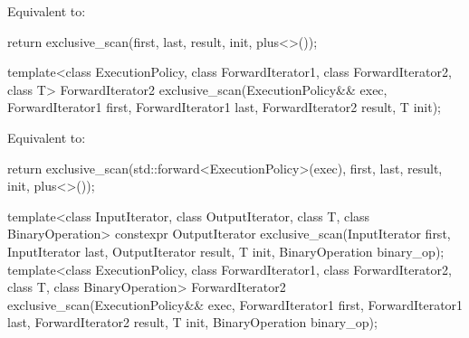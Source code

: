 \begin{itemdescr}
\pnum
\effects
Equivalent to:
\begin{codeblock}
return exclusive_scan(first, last, result, init, plus<>());
\end{codeblock}
\end{itemdescr}

%
\begin{itemdecl}
template<class ExecutionPolicy, class ForwardIterator1, class ForwardIterator2, class T>
  ForwardIterator2
    exclusive_scan(ExecutionPolicy&& exec,
                   ForwardIterator1 first, ForwardIterator1 last,
                   ForwardIterator2 result, T init);
\end{itemdecl}

\begin{itemdescr}
\pnum
\effects
Equivalent to:
\begin{codeblock}
return exclusive_scan(std::forward<ExecutionPolicy>(exec),
                      first, last, result, init, plus<>());
\end{codeblock}
\end{itemdescr}

%
\begin{itemdecl}
template<class InputIterator, class OutputIterator, class T, class BinaryOperation>
  constexpr OutputIterator
    exclusive_scan(InputIterator first, InputIterator last,
                   OutputIterator result, T init, BinaryOperation binary_op);
template<class ExecutionPolicy,
         class ForwardIterator1, class ForwardIterator2, class T, class BinaryOperation>
  ForwardIterator2
    exclusive_scan(ExecutionPolicy&& exec,
                   ForwardIterator1 first, ForwardIterator1 last,
                   ForwardIterator2 result, T init, BinaryOperation binary_op);
\end{itemdecl}

